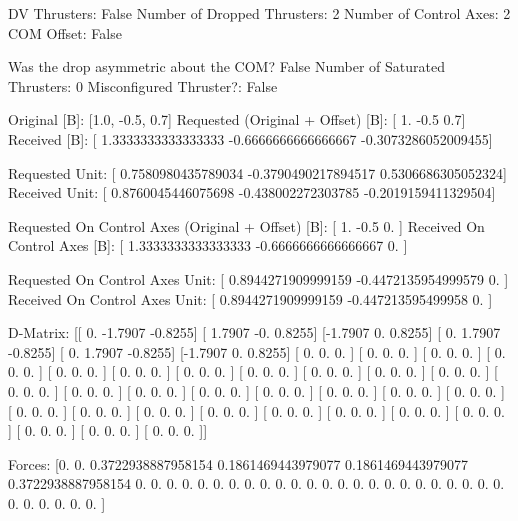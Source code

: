 DV Thrusters:	False
Number of Dropped Thrusters:	2
Number of Control Axes:	2
COM Offset:	False

Was the drop asymmetric about the COM?	False
Number of Saturated Thrusters:	0
Misconfigured Thruster?:	False

Original [B]:	[1.0, -0.5, 0.7]
Requested (Original + Offset) [B]:	[ 1.  -0.5  0.7]
Received [B]:		[ 1.3333333333333333 -0.6666666666666667 -0.3073286052009455]

Requested Unit:		[ 0.7580980435789034 -0.3790490217894517  0.5306686305052324]
Received Unit:		[ 0.8760045446075698 -0.438002272303785  -0.2019159411329504]

Requested On Control Axes (Original + Offset) [B]:	[ 1.  -0.5  0. ]
Received On Control Axes [B]:		[ 1.3333333333333333 -0.6666666666666667  0.                ]

Requested On Control Axes Unit:		[ 0.8944271909999159 -0.4472135954999579  0.                ]
Received On Control Axes Unit:		[ 0.8944271909999159 -0.447213595499958   0.                ]

D-Matrix:
[[ 0.     -1.7907 -0.8255]
 [ 1.7907 -0.      0.8255]
 [-1.7907  0.      0.8255]
 [ 0.      1.7907 -0.8255]
 [ 0.      1.7907 -0.8255]
 [-1.7907  0.      0.8255]
 [ 0.      0.      0.    ]
 [ 0.      0.      0.    ]
 [ 0.      0.      0.    ]
 [ 0.      0.      0.    ]
 [ 0.      0.      0.    ]
 [ 0.      0.      0.    ]
 [ 0.      0.      0.    ]
 [ 0.      0.      0.    ]
 [ 0.      0.      0.    ]
 [ 0.      0.      0.    ]
 [ 0.      0.      0.    ]
 [ 0.      0.      0.    ]
 [ 0.      0.      0.    ]
 [ 0.      0.      0.    ]
 [ 0.      0.      0.    ]
 [ 0.      0.      0.    ]
 [ 0.      0.      0.    ]
 [ 0.      0.      0.    ]
 [ 0.      0.      0.    ]
 [ 0.      0.      0.    ]
 [ 0.      0.      0.    ]
 [ 0.      0.      0.    ]
 [ 0.      0.      0.    ]
 [ 0.      0.      0.    ]
 [ 0.      0.      0.    ]
 [ 0.      0.      0.    ]
 [ 0.      0.      0.    ]
 [ 0.      0.      0.    ]
 [ 0.      0.      0.    ]
 [ 0.      0.      0.    ]]

Forces:
[0.                 0.                 0.3722938887958154
 0.1861469443979077 0.1861469443979077 0.3722938887958154
 0.                 0.                 0.
 0.                 0.                 0.
 0.                 0.                 0.
 0.                 0.                 0.
 0.                 0.                 0.
 0.                 0.                 0.
 0.                 0.                 0.
 0.                 0.                 0.
 0.                 0.                 0.
 0.                 0.                 0.                ]

